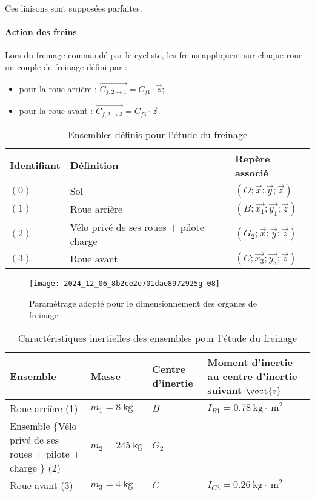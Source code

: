 Ces liaisons sont supposées parfaites.

\paragraph*{Action des freins} Lors du freinage commandé par le cycliste, les freins appliquent sur chaque roue un couple de freinage défini par :
\begin{itemize}
\item pour la roue arrière : \(\overrightarrow{C_{f, 2 \rightarrow 1}}=C_{f 1} \cdot \vec{z}\);
\item pour la roue avant : \(\overrightarrow{C_{f, 2 \rightarrow 3}}=C_{f 3} \cdot \vec{z}\).
\end{itemize}


\begin{table}[!h]
\centering
\begin{tabular}{lll}
\hline
\textbf{Identifiant} & \textbf{Définition} & \textbf{Repère associé} \\
\hline
\((0)\) & Sol & \((O ; \vec{x} ; \vec{y} ; \vec{z})\) \\
\((1)\) & Roue arrière & \(\left(B ; \overrightarrow{x_{1}} ; \overrightarrow{y_{1}} ; \vec{z}\right)\) \\
\((2)\) & Vélo privé de ses roues + pilote + charge & \(\left(G_{2} ; \vec{x} ; \vec{y} ; \vec{z}\right)\) \\
\((3)\) & Roue avant & \(\left(C ; \overrightarrow{x_{3}} ; \overrightarrow{y_{3}} ; \vec{z}\right)\) \\
\hline
\end{tabular}
\caption{Ensembles définis pour l'étude du freinage \label{tab_31}}
\end{table}




\begin{figure}[!htb]
\begin{center}
\texttt{[image: 2024\_12\_06\_8b2ce2e701dae8972925g-08]}
\caption{Paramétrage adopté pour le dimensionnement des organes de freinage \label{fig_32}}
\end{center}
\end{figure}


\begin{table}[!h]
\centering
\begin{tabular}{p{4cm}p{3cm}p{3cm}p{4cm}}
\hline
\textbf{Ensemble} & \textbf{Masse} & \textbf{Centre d'inertie}&\textbf{Moment d'inertie au centre d'inertie suivant } $\vect{z}$ \\
\hline
Roue arrière (1) & \(m_{1}=8 \mathrm{~kg}\) & \(B\) & \(I_{B 1}=0.78 \mathrm{~kg} \cdot \mathrm{~m}^{2}\) \\
Ensemble \{Vélo privé de ses roues + pilote + charge \} (2)  & \(m_{2}=245 \mathrm{~kg}\) & \(G_{2}\) & - \\
Roue avant (3) & \(m_{3}=4 \mathrm{~kg}\) & \(C\) & \(I_{C 3}=0.26 \mathrm{~kg} \cdot \mathrm{~m}^{2}\) \\
\hline
\end{tabular}
\caption{ Caractéristiques inertielles des ensembles pour l'étude du freinage \label{tab_32}}
\end{table}


